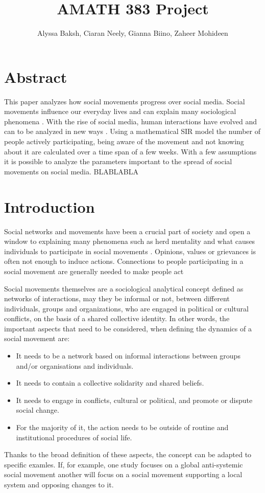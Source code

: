 \documentclass{article}
\title{AMATH 383 Project}
\author{
    Alyssa Baksh, 
    Ciaran Neely,
    Gianna Biino,
    Zaheer Mohideen
}
\begin{document}
    \maketitle

    \section{Abstract}
    This paper analyzes how social movements progress over social media. Social movements influence our everyday lives and can explain many sociological phenomena \cite{diani_networks_2013}. With the rise of social media, human interactions have evolved and can to be analyzed in new ways \cite{kidd_social_2016}. Using a mathematical SIR model the number of people actively participating, being aware of the movement and not knowing about it are calculated over a time span of a few weeks. With a few assumptions it is possible to analyze the parameters important to the spread of social movements on social media. BLABLABLA
    
    \section{Introduction}
    Social networks and movements have been a crucial part of society and open a window to explaining many phenomena such as herd mentality and what causes individuals to participate in social movements \cite{diani_networks_2013}. Opinions, values or grievances is often not enough to induce actions. Connections to people participating in a social movement are generally needed to make people act \cite{diani_networks_2013}
    
    Social movements themselves are a sociological analytical concept defined as networks of interactions, may they be informal or not, between different individuals, groups and organizations, who are engaged in political or cultural conflicts, on the basis of a shared collective identity. In other words, the important aspects that need to be considered, when defining the dynamics of a social movement are: 
    \begin{itemize}
    \item It needs to be a network based on informal interactions between groups and/or organisations and individuals.
    \item It needs to contain a collective solidarity and shared beliefs.
    \item It needs to engage in conflicts, cultural or political, and promote or dispute social change.
    \item  For the majority of it, the action needs to be outside of routine and institutional procedures of social life.
    \end{itemize}
    Thanks to the broad definition of these aspects, the concept can be adapted to specific examles. If, for example, one study focuses on a global anti-systemic social movement another will focus on a social movement supporting a local system and opposing changes to it. \cite{diani_concept_1992}
    
\end{document}
